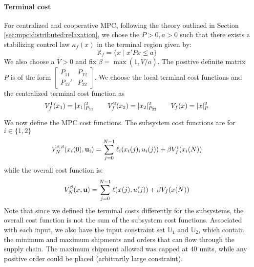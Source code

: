\paragraph{Terminal cost}
For centralized and cooperative MPC, following the theory outlined in
Section \ref{sec:mpc:distributed:relaxation}, we chose the $P>0,a>0$ such that there exists a
stabilizing control law $\kappa_f(x)$ in the terminal region given by:
\begin{equation*}
\mathbb{X}_f = \lbrace x \mid x'Px \leq a \rbrace
\end{equation*}
We also choose a $\bar{V}>0$ and fix $\beta = \max{(1,\bar{V}/a)}$. The
positive definite matrix $P$ is of the form $\left[ \begin{smallmatrix}P_{11}&
  P_{12} \\ P_{12}' & P_{22}\end{smallmatrix} \right]$. We choose the local
terminal cost functions and the centralized terminal cost function as 
\begin{equation*}
V_f^{1}(x_1) = \vert x_1 \vert_{P_{11}}^2 \qquad 
V_f^{2}(x_2) = \vert x_2 \vert_{P_{22}}^2 \qquad
V_f(x) = \vert x \vert_P^2
\end{equation*}

We now define the MPC cost functions. The subsystem cost functions
are for $i \in \lbrace 1,2 \rbrace$
\begin{equation*}
V_N^{i,\beta}(x_i(0),\mathbf{u}_i) =
\sum_{j=0}^{N-1}\ell_i(x_i(j),u_i(j)) \\ 
+ \beta V_f^{i}(x_i(N))
\end{equation*}
while the overall cost function is:
\begin{equation*}
V_N^\beta(x,\mathbf{u}) = \sum_{j=0}^{N-1}\ell(x(j),u(j)) + \beta V_f(x(N))
\end{equation*}
Note that since we defined the terminal costs differently for the
subsystems, the overall cost function 
is not the sum of the subsystem cost functions. 
Associated with each input, we also have the input constraint set
$\mathbb{U}_1$ and $\mathbb{U}_2$, which contain the minimum and maximum
shipments and orders that can flow through the supply chain. The
maximum shipment allowed was capped at $40$ units, while any positive
order could be placed (arbitrarily large constraint).

